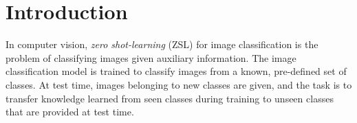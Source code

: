 \documentclass[11pt,a4paper]{article}
\newcommand\gal[1]{\textcolor{bright}{\textbf{GAL:} #1 }}
\begin{document}
\begin{abstract}
\end{abstract}





\section{Introduction}

In computer vision, {\em zero shot-learning} (ZSL) for image classification is the problem of classifying images given auxiliary information. The image classification model is trained to classify images from a known, pre-defined set of classes. At test time, images belonging to new classes are given, and the task is to transfer knowledge learned from seen classes during training to unseen classes that are provided at test time. 
\end{document}
